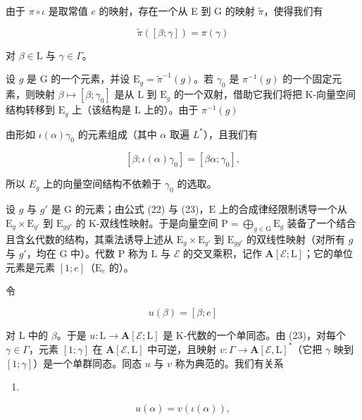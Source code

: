 由于 \(\pi \circ \iota\) 是取常值 \(e\) 的映射，存在一个从 E 到 G 的映射 \(\widetilde{\pi}\)，使得我们有

\[
\widetilde {\pi} ([ \beta ; \gamma ]) = \pi (\gamma)\tag{24}
\]

对 \(\beta \in \mathrm{L}\) 与 \(\gamma \in \Gamma\)。

设 \(g\) 是 \(\mathrm{G}\) 的一个元素，并设 \(\mathrm{E}_g = \widetilde{\pi}^{-1}(g)\)。若 \(\gamma_0\) 是 \(\pi^{-1}(g)\) 的一个固定元素，则映射 \(\beta \mapsto [\beta; \gamma_0]\) 是从 \(\mathrm{L}\) 到 \(\mathrm{E}_g\) 的一个双射，借助它我们将把 K-向量空间结构转移到 \(\mathrm{E}_g\) 上（该结构是 \(\mathrm{L}\) 上的）。由于 \(\pi^{-1}(g)\)

由形如 \(\iota(\alpha)\gamma_{0}\) 的元素组成（其中 \(\alpha\) 取遍 \(L^{*}\)），且我们有

\[
[ \beta ; \iota (\alpha) \gamma_ {0} ] = [ \beta \alpha ; \gamma_ {0} ],
\]

所以 \(E_{g}\) 上的向量空间结构不依赖于 \(\gamma_{0}\) 的选取。

设 \(g\) 与 \(g'\) 是 \(\mathrm{G}\) 的元素；由公式 (22) 与 (23)，\(\mathrm{E}\) 上的合成律经限制诱导一个从 \(\mathrm{E}_g \times \mathrm{E}_{g'}\) 到 \(\mathrm{E}_{gg'}\) 的 K-双线性映射。于是向量空间 \(\mathrm{P} = \bigoplus_{g \in \mathrm{G}} \mathrm{E}_g\) 装备了一个结合且含幺代数的结构，其乘法诱导上述从 \(\mathrm{E}_g \times \mathrm{E}_{g'}\) 到 \(\mathrm{E}_{gg'}\) 的双线性映射（对所有 \(g\) 与 \(g'\)，均在 \(\mathrm{G}\) 中）。代数 \(\mathrm{P}\) 称为 \(\mathrm{L}\) 与 \(\mathcal{E}\) 的交叉乘积，记作 \(\mathbf{A}[\mathcal{E};\mathrm{L}]\)；它的单位元素是元素 \([1;e]\)（\(\mathrm{E}_e\) 的）。

令

\[
u (\beta) = [ \beta ; e ]\tag{25}
\]

对 L 中的 \(\beta\)。于是 \(u: \mathrm{L} \to \mathbf{A}[\mathcal{E};\mathrm{L}]\) 是 K-代数的一个单同态。由 (23)，对每个 \(\gamma \in \Gamma\)，元素 \([1;\gamma]\) 在 \(\mathbf{A}[\mathcal{E},\mathrm{L}]\) 中可逆，且映射 \(v: \Gamma \to \mathbf{A}[\mathcal{E},\mathrm{L}]^*\)（它把 \(\gamma\) 映到 \([1;\gamma]\)）是一个单群同态。同态 \(u\) 与 \(v\) 称为典范的。我们有关系

\begin{enumerate}
\def\labelenumi{(\arabic{enumi})}
\setcounter{enumi}{25}
\tightlist
\item
\end{enumerate}

\[
u (\alpha) = v (\iota (\alpha)),\tag{27}
\]

